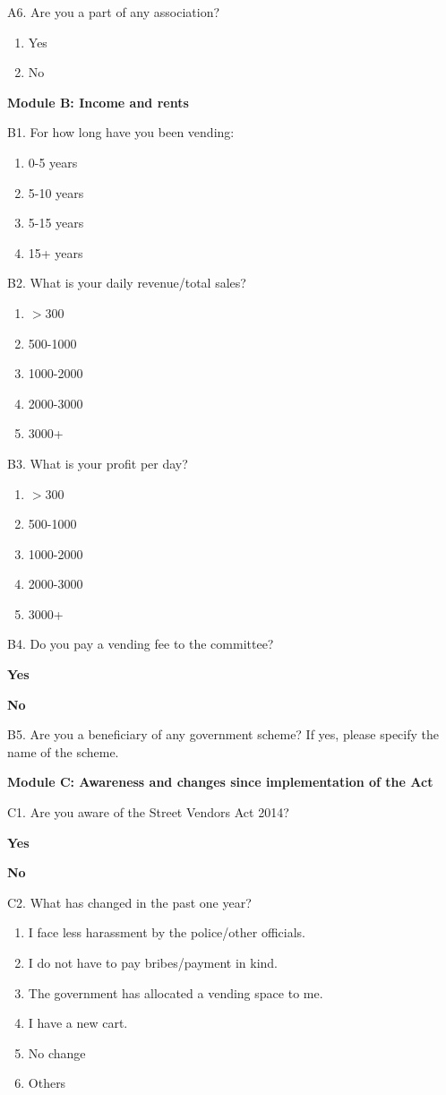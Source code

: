 \documentclass[a4paper, 12pt, twoside]{article}
\begin{document}
{{\begin{mdframed}[backgroundcolor=gray!20]
A6. Are you a part of any association?
\begin{enumerate}
\item Yes
\item No
\end{enumerate}

\textbf{Module B: Income and rents}

B1. For how long have you been vending:
\begin{enumerate}
\item 0-5 years
\item 5-10 years
\item 5-15 years
\item 15+ years
\end{enumerate}

B2. What is your daily revenue/total sales?
\begin{enumerate}
\item $>$300
\item 500-1000
\item 1000-2000
\item 2000-3000
\item 3000+
\end{enumerate}

B3. What is your profit per day?
\begin{enumerate}
\item $>$300
\item 500-1000
\item 1000-2000
\item 2000-3000
\item 3000+
\end{enumerate}

B4. Do you pay a vending fee to the committee?

\textbf{Yes}

\textbf{No}

B5. Are you a beneficiary of any government scheme? If yes, please specify the name of the scheme.

\textbf{Module C: Awareness and changes since implementation of the Act}

C1. Are you aware of the Street Vendors Act 2014?

\textbf{Yes}

\textbf{No}

C2. What has changed in the past one year?
\begin{enumerate}
\item I face less harassment by the police/other officials.
\item I do not have to pay bribes/payment in kind.
\item The government has allocated a vending space to me.
\item I have a new cart.
\item No change
\item Others
\end{enumerate}


\end{mdframed}}}
\end{document}
